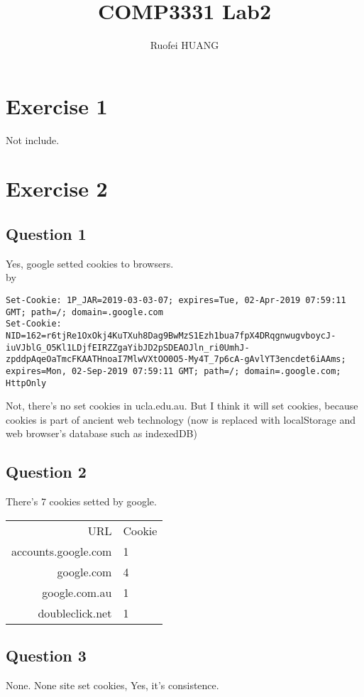 \documentclass{article}
\begin{document}
\title{COMP3331 Lab2}
\author{Ruofei HUANG}

\maketitle
\section{Exercise 1}
Not include.
\section{Exercise 2}

\subsection{Question 1}

Yes, google setted cookies to browsers.\\
by \\

\begin{lstlisting}
Set-Cookie: 1P_JAR=2019-03-03-07; expires=Tue, 02-Apr-2019 07:59:11 GMT; path=/; domain=.google.com
Set-Cookie: NID=162=r6tjRe1OxOkj4KuTXuh8Dag9BwMzS1Ezh1bua7fpX4DRqgnwugvboycJ-iuVJblG_O5Kl1LDjfEIRZZgaYibJD2pSDEAOJln_ri0UmhJ-zpddpAqeOaTmcFKAATHnoaI7MlwVXtOO0O5-My4T_7p6cA-gAvlYT3encdet6iAAms; expires=Mon, 02-Sep-2019 07:59:11 GMT; path=/; domain=.google.com; HttpOnly
\end{lstlisting}
Not, there's no set cookies in ucla.edu.au. But I think it will set cookies, because cookies is part of ancient web technology (now is replaced with localStorage and web browser's database such as indexedDB)

\subsection{Question 2}
There's 7 cookies setted by google.

\begin{tabular}{|r|l|}
    URL & Cookie\\
    accounts.google.com& 1\\
    google.com & 4\\
    google.com.au & 1 \\
    doubleclick.net & 1\\
\end{tabular}

\subsection{Question 3}
None. None site set cookies, Yes, it's consistence.
\end{document}

